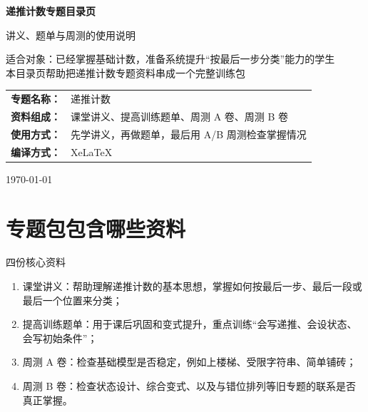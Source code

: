 \documentclass[11pt,a4paper,fontset=fandol]{ctexart}
\begin{document}
\thispagestyle{empty}
\begin{titlepage}
\centering
\vspace*{0.9cm}

\begin{tcolorbox}[
  enhanced,
  width=0.92\textwidth,
  colback=white,
  colframe=mainblue,
  boxrule=1pt,
  arc=0mm,
  left=6mm,
  right=6mm,
  top=8mm,
  bottom=8mm
]
\centering

{\fontsize{24}{30}\selectfont\bfseries 递推计数专题目录页\par}
\vspace{0.65cm}
{\fontsize{17}{22}\selectfont 讲义、题单与周测的使用说明\par}

\vspace{1cm}
\begin{tcolorbox}[colback=lightblue,colframe=mainblue,width=0.84\textwidth,boxrule=1pt]
\centering
{\large 适合对象：已经掌握基础计数，准备系统提升“按最后一步分类”能力的学生}\\[0.35em]
{\normalsize 本目录页帮助把递推计数专题资料串成一个完整训练包}
\end{tcolorbox}

\vspace{1.0cm}
\renewcommand{\arraystretch}{1.42}
\begin{tabular}{>{\bfseries}p{3.5cm}p{8cm}}
专题名称： & 递推计数 \\
资料组成： & 课堂讲义、提高训练题单、周测 A 卷、周测 B 卷 \\
使用方式： & 先学讲义，再做题单，最后用 A/B 周测检查掌握情况 \\
编译方式： & XeLaTeX \\
\end{tabular}

\vspace{0.9cm}
{\large \today\par}
\end{tcolorbox}
\end{titlepage}

\tableofcontents
\newpage

\section{专题包包含哪些资料}

\begin{goalbox}{四份核心资料}
\begin{enumerate}
  \item 课堂讲义：帮助理解递推计数的基本思想，掌握如何按最后一步、最后一段或最后一个位置来分类；
  \item 提高训练题单：用于课后巩固和变式提升，重点训练“会写递推、会设状态、会写初始条件”；
  \item 周测 A 卷：检查基础模型是否稳定，例如上楼梯、受限字符串、简单铺砖；
  \item 周测 B 卷：检查状态设计、综合变式、以及与错位排列等旧专题的联系是否真正掌握。
\end{enumerate}
\end{goalbox}
\end{document}
